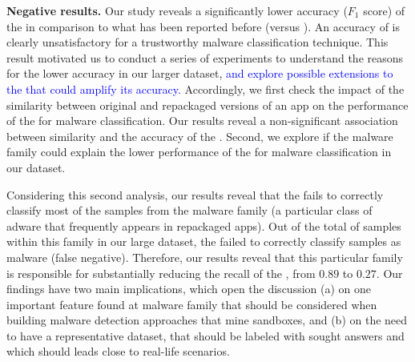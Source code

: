 {\bf Negative results.} Our study reveals a significantly lower
accuracy ($F_1$ score) of the \mas in comparison to what has been reported before (\fscore versus \fscoreSmall). 
An accuracy of \fscore is clearly unsatisfactory for a trustworthy malware classification technique.
This result motivated us to conduct a series of experiments 
to understand the reasons for the lower accuracy in our larger dataset, \textcolor{blue}{and explore possible extensions to the \mas that could amplify its accuracy.}
Accordingly, we first check the impact of the similarity between original and repackaged versions of
an app on the performance of the \mas for malware classification. Our results reveal a non-significant association between similarity and the accuracy of the \mas. 
Second, we explore if the
malware family could explain the lower performance of the \mas for malware classification in 
our dataset.

Considering this second analysis, our results reveal that the \mas fails to correctly classify most of the samples from
the \gps malware family (a particular class of adware that frequently appears in repackaged apps). 
Out of the total of \appsGps samples within this family in our large dataset, the \mas failed to correctly classify \appsGpsFN samples as malware (false negative).
Therefore, our results reveal that this particular family is responsible for substantially reducing the recall of the \mas, from $0.89$ to $0.27$.
Our findings have two main implications, which open the discussion (a) on one important feature found at \gps malware family that should be
considered when building malware detection approaches that mine sandboxes, and (b) on the need to have a representative dataset, that should be labeled with sought
answers and which should leads close to real-life scenarios.
  

%

